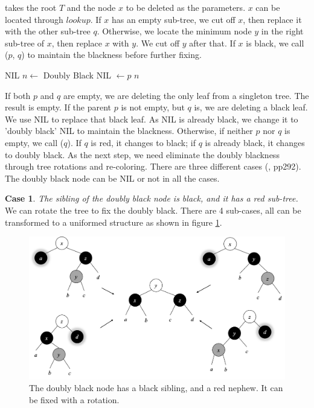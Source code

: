 \documentclass[b5paper]{article}
\begin{document}
 takes the root $T$ and the node $x$ to be deleted as the parameters. $x$ can be located through $lookup$. If $x$ has an empty sub-tree, we cut off $x$, then replace it with the other sub-tree $q$. Otherwise, we locate the minimum node $y$ in the right sub-tree of $x$, then replace $x$ with $y$. We cut off $y$ after that. If $x$ is black, we call ($p$, $q$) to maintain the blackness before further fixing.

\begin{algorithmic}[1]
    \State \Return NIL 
    \State $n \gets$ Doubly Black NIL
    \State {} $\gets p$
    \State \Return $n$
  \Else
    \State \Return {}
  \EndIf
\EndFunction
\end{algorithmic}

If both $p$ and $q$ are empty, we are deleting the only leaf from a singleton tree. The result is empty. If the parent $p$ is not empty, but $q$ is, we are deleting a black leaf. We use NIL to replace that black leaf. As NIL is already black, we change it to 'doubly black' NIL to maintain the blackness. Otherwise, if neither $p$ nor $q$ is empty, we call ($q$). If $q$ is red, it changes to black; if $q$ is already black, it changes to doubly black. As the next step, we need eliminate the doubly blackness through tree rotations and re-coloring. There are three different cases (\cite{CLRS}, pp292). The doubly black node can be NIL or not in all the cases.

\textbf{Case 1}. {\em The sibling of the doubly black node is black, and it has a red sub-tree.} We can rotate the tree to fix the doubly black. There are 4 sub-cases, all can be transformed to a uniformed structure as shown in figure \ref{fig:del-case1}.

\begin{figure}[htbp]
   \centering
   \includegraphics[scale=0.4]{../../../datastruct/tree/red-black-tree/img/del-case1.png}
   \caption{The doubly black node has a black sibling, and a red nephew. It can be fixed with a rotation.}
   \label{fig:del-case1}
\end{figure}
\end{document}
